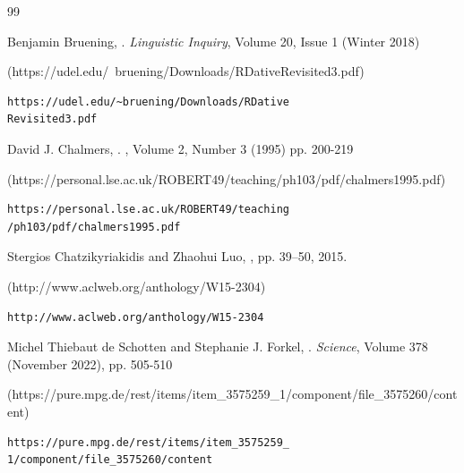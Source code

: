 \begin{thebibliography}{99}
{
Benjamin Bruening,  
.
\textit{Linguistic Inquiry}, 
Volume 20, Issue 1 (Winter 2018)
%
\begin{boxurl}(https://udel.edu/~bruening/Downloads/RDativeRevisited3.pdf)
\begin{lstlisting}
https://udel.edu/~bruening/Downloads/RDative
Revisited3.pdf
\end{lstlisting}
\end{boxurl}




David J. Chalmers,  
.
, 
Volume 2, Number 3 (1995) pp. 200-219
%
\begin{boxurl}(https://personal.lse.ac.uk/ROBERT49/teaching/ph103/pdf/chalmers1995.pdf)
\begin{lstlisting}
https://personal.lse.ac.uk/ROBERT49/teaching
/ph103/pdf/chalmers1995.pdf
\end{lstlisting}
\end{boxurl}





Stergios Chatzikyriakidis and Zhaohui Luo, 
, pp. 39–50, 2015. 
%
\begin{boxurl}(http://www.aclweb.org/anthology/W15-2304)
\begin{lstlisting}
http://www.aclweb.org/anthology/W15-2304
\end{lstlisting}
\end{boxurl}



Michel Thiebaut de Schotten and Stephanie J. Forkel,  
.
\textit{Science}, 
Volume 378 (November 2022), pp. 505-510
%
\begin{boxurl}(https://pure.mpg.de/rest/items/item_3575259_1/component/file_3575260/content)
\begin{lstlisting}
https://pure.mpg.de/rest/items/item_3575259_
1/component/file_3575260/content
\end{lstlisting}
\end{boxurl}


}
\end{thebibliography}

